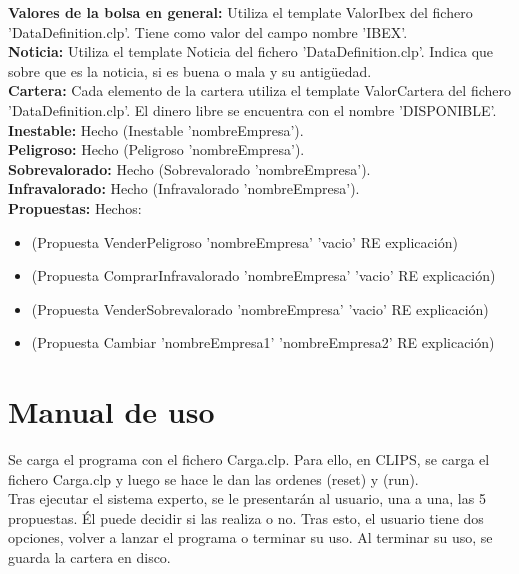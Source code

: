 \textbf{Valores de la bolsa en general:} Utiliza el template ValorIbex del fichero 'DataDefinition.clp'. Tiene como valor del campo nombre 'IBEX'.\\

\textbf{Noticia:} Utiliza el template Noticia del fichero 'DataDefinition.clp'. Indica que sobre que es la noticia, si es buena o mala y su antigüedad.\\

\textbf{Cartera:} Cada elemento de la cartera utiliza el template ValorCartera del fichero 'DataDefinition.clp'. El dinero libre se encuentra con el nombre 'DISPONIBLE'.\\

\textbf{Inestable:} Hecho (Inestable 'nombreEmpresa').\\

\textbf{Peligroso:} Hecho (Peligroso 'nombreEmpresa').\\

\textbf{Sobrevalorado:} Hecho (Sobrevalorado 'nombreEmpresa').\\

\textbf{Infravalorado:} Hecho (Infravalorado 'nombreEmpresa').\\

\textbf{Propuestas:} Hechos:
\begin{itemize}
\item (Propuesta VenderPeligroso 'nombreEmpresa' 'vacio' RE explicación)
\item (Propuesta ComprarInfravalorado 'nombreEmpresa' 'vacio' RE explicación)
\item (Propuesta VenderSobrevalorado 'nombreEmpresa' 'vacio' RE explicación)
\item (Propuesta Cambiar 'nombreEmpresa1' 'nombreEmpresa2' RE explicación)
\end{itemize}

\newpage
\section{Manual de uso}

Se carga el programa con el fichero Carga.clp. Para ello, en CLIPS, se carga el fichero Carga.clp y luego se hace le dan las ordenes (reset) y (run).\\

Tras ejecutar el sistema experto, se le presentarán al usuario, una a una, las 5 propuestas. Él puede decidir si las realiza o no. Tras esto, el usuario tiene dos opciones, volver a lanzar el programa o terminar su uso. Al terminar su uso, se guarda la cartera en disco.\\
